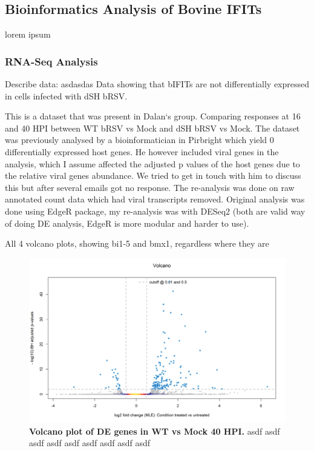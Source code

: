 \subsection{Bioinformatics Analysis of Bovine IFITs} \label{subsec:Bioinformatics Analysis of Bovine IFITs}
lorem ipsum

\subsubsection{RNA-Seq Analysis}
Describe data: \newline
asdasdas \newline
Data showing that bIFITs are not differentially expressed in cells infected with dSH bRSV.

This is a dataset that was present in Dalan`s group. Comparing responses at 16 and 40 HPI between WT bRSV vs Mock and dSH bRSV vs Mock. The dataset was previously analysed by a bioinformatician in Pirbright which yield 0 differentially expressed host genes. He however included viral genes in the analysis, which I assume affected the adjusted p values of the host genes due to the relative viral genes abundance. We tried to get in touch with him to discuss this but after several emails got no response. The re-analysis was done on raw annotated count data which had viral transcripts removed. Original analysis was done using EdgeR package, my re-analysis was with DESeq2 (both are valid way of doing DE analysis, EdgeR is more modular and harder to use).

All 4 volcano plots, showing bi1-5 and bmx1, regardless where they are

\begin{figure}
    \centering
    \includegraphics[width=1\linewidth]{08. Chapter 3/Figs/02. Bovine/01. rnaseq volcano.png}
    \caption[Volcano plot of DE genes in WT vs Mock 40 HPI.]{\textbf{Volcano plot of DE genes in WT vs Mock 40 HPI.} asdf asdf asdf asdf asdf asdf asdf asdf asdf }
    \label{fig:Volcano plot of DE genes in WT vs Mock 40 HPI}
\end{figure}

